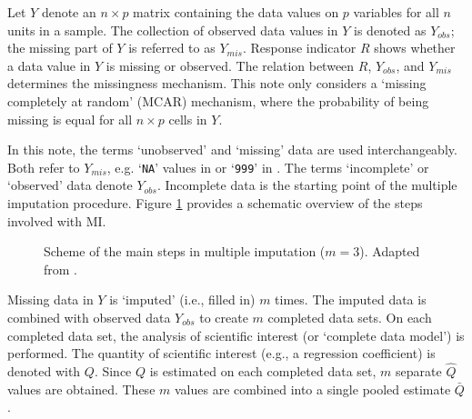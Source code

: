 \documentclass[article]{jss}
\begin{document}
Let $Y$ denote an $n \times p$ matrix containing the data values on $p$ variables for all $n$ units in a sample. The collection of observed data values in $Y$ is denoted as $Y_{obs}$; the missing part of $Y$ is referred to as $Y_{mis}$. Response indicator $R$ shows whether a data value in $Y$ is missing or observed. The relation between $R$, $Y_{obs}$, and $Y_{mis}$ determines the missingness mechanism. This note only considers a `missing completely at random' (MCAR) mechanism, where the probability of being missing is equal for all $n \times p$ cells in $Y$.

In this note, the terms `unobserved' and `missing' data are used interchangeably. Both refer to $Y_{mis}$, e.g. `\texttt{NA}' values in  or `\texttt{999}' in . The terms `incomplete' or `observed' data denote $Y_{obs}$. Incomplete data is the starting point of the multiple imputation procedure. Figure \ref{fig:steps} provides a schematic overview of the steps involved with MI.

\begin{figure}
\label{fig:steps}
\centering
	\large{}
\caption{Scheme of the main steps in multiple imputation ($m = 3$). Adapted from \cite[\S~1.4.1]{buur18}.}
\end{figure}

Missing data in $Y$ is `imputed' (i.e., filled in) $m$ times. The imputed data is combined with observed data $Y_{obs}$ to create $m$ completed data sets. On each completed data set, the analysis of scientific interest (or `complete data model') is performed. The quantity of scientific interest (e.g., a regression coefficient) is denoted with $Q$. Since $Q$ is estimated on each completed data set, $m$ separate $\hat{Q}$ values are obtained. These $m$ values are combined into a single pooled estimate $\bar{Q}$.
\end{document}
